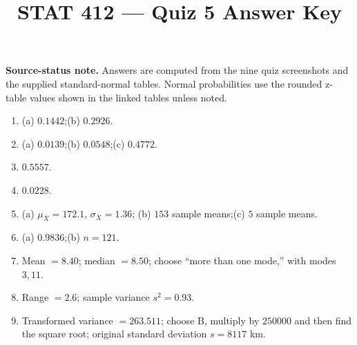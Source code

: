 \documentclass[11pt]{article}
\title{STAT 412 --- Quiz 5 Answer Key}
\author{}
\date{}
\begin{document}
\maketitle

\noindent\textbf{Source-status note.} Answers are computed from the nine quiz
screenshots and the supplied standard-normal tables. Normal probabilities use
the rounded z-table values shown in the linked tables unless noted.

\begin{enumerate}[leftmargin=*,label=\textbf{\arabic*.}]
\item (a) $0.1442$;\quad (b) $0.2926$.
\item (a) $0.0139$;\quad (b) $0.0548$;\quad (c) $0.4772$.
\item $0.5557$.
\item $0.0228$.
\item (a) $\mu_{\bar X}=172.1$, $\sigma_{\bar X}=1.36$;\quad
(b) $153$ sample means;\quad (c) $5$ sample means.
\item (a) $0.9836$;\quad (b) $n=121$.
\item Mean $=8.40$; median $=8.50$; choose ``more than one mode,'' with modes
$3,11$.
\item Range $=2.6$; sample variance $s^2=0.93$.
\item Transformed variance $=263.511$; choose B, multiply by $250000$ and then
find the square root; original standard deviation $s=8117$ km.
\end{enumerate}
\end{document}
